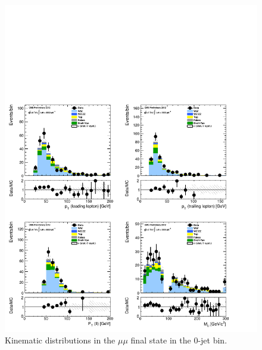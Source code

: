 \begin{figure}[!hbtp]
\centering
\includegraphics[width=1\textwidth]{figures/ww_analysis20_0_ALL_mm_0j.pdf}
\caption{Kinematic distributions in the $\mu\mu$ final state in the 0-jet bin.}
\label{fig:xs_kinematics_mm_0j}
\end{figure}
